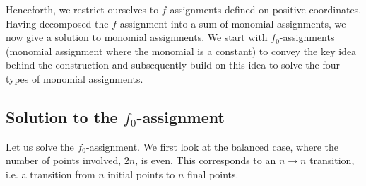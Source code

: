 \documentclass{article}
\newcommand{\atul}[1]{#1} %
\begin{document}
%
%
%
%
%
%
%
%
%
%
%

%
%
%
%
%
%
%
%
%
%
%

%
%
%
%
%
%
%
%
%
%
%
%
%
%
%
%
%
%

\atul{Henceforth, we restrict ourselves to $f$-assignments defined on positive coordinates.} Having decomposed the $f$-assignment into a sum of monomial assignments, we now give a solution to monomial assignments. We start with $f_0$-assignments (monomial assignment where the monomial is a  constant) to convey the key idea behind the construction and subsequently build on this idea to solve the four types of monomial assignments. %


\subsection{Solution to the \texorpdfstring{$f_0$}{f 0}-assignment}
\label{subsec:f0algebraic}
%
%
Let us solve the $f_0$-assignment. We first look at
the balanced case, where the number of points involved, $2n$, is
even. This corresponds to an $n\to n$ transition, i.e. a transition from $n$ initial points to $n$ final points.
\end{document}
